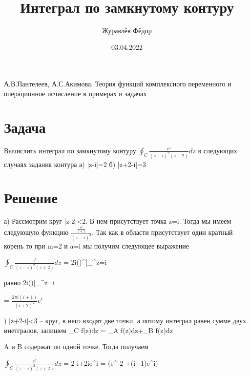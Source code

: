 \documentclass{article}
\title{Интеграл по замкнутому контуру}
\author{Журавлёв Фёдор}
\date{03.04.2022}
\begin{document}
\maketitle
\begin{thebibliography}{1}
А.В.Пантелеев, А.С.Акимова. Теория функций комплексного переменного
и операционное исчисление в примерах и задачах

\end{thebibliography}
\section{Задача}
Вычислить интеграл по замкнутому контуру
$\oint_C \frac{e^z}{(z-i)^2(z+2)}dz$
в следующих случаях задания контура а) |z-i|=2 б) |z+2-i|=3
\section{Решение}

а) Рассмотрим круг |z-2|<2. В нем присутствует точка z=i. Тогда мы имеем следующую
функцию $\frac{\frac{e^z}{z+2}}{(z-i)^2}$.
Так как в области присутствует один кратный корень то при m=2 и a=i мы получим следующее выражение \par \noindent$\oint_C \frac{e^z}{(z-i)^2(z+2)}dz$ = 2\pi i()^\prime\bigg|_^z=i
\par{} равно 2\pi i()|_^z=i
\par\noindent= $\frac{2\pi i(i+1)}{(i+2)^2}e^i$
\par{}) |z+2-i|<3 -- круг, в него входят две точки, а потому интеграл равен сумме двух инетгралов, запишем \oint_C f(z)dz = \oint_A f(z)dz+\oint_B f(z)dz
\par{} A и B содержат по одной точке. Тогда получаем
\par\noindent$\oint_C \frac{e^z}{(z-i)^2(z+2)}dz$ = 2\pi
i+2\pi ie^i = (e^-2 +(i+1)e^i)
\end{document}

